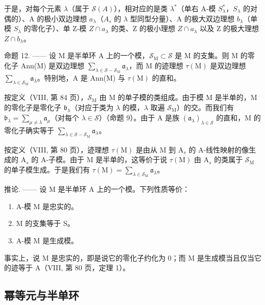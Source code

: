 于是，对每个元素 \(\lambda\)（属于 \(\mathcal{S}(A)\)），相对应的是类 \(\lambda^{*}\)（单右 A-模 \(S_{\lambda}^{*}\)，\(S_{\lambda}\) 的对偶的）、A 的极小双边理想 \(a_{\lambda}\)（\(A_{s}\) 的 \(\lambda\) 型同型分量）、A 的极大双边理想 \(b_{\lambda}\)（单模 \(S_{\lambda}\) 的零化子）、单 Z-模 \(Z \cap a_{\lambda}\) 的类、Z 的极小理想 \(Z \cap a_{\lambda}\) 以及 Z 的极大理想 \(Z \cap b_{\lambda}\)。

命题 12. —— 设 M 是半单环 A 上的一个模，\(\mathcal{S}_{\mathrm{M}} \subset \mathcal{S}\) 是 M 的支集。则 M 的零化子 Ann(M) 是双边理想 \(\sum_{\lambda \in \mathcal{S} - \mathcal{S}_{\mathrm{M}}} \mathfrak{a}_{\lambda}\)，而 M 的迹理想 \(\tau(\mathrm{M})\) 是双边理想 \(\sum_{\lambda \in \mathcal{S}_{\mathrm{M}}} \mathfrak{a}_{\lambda}\)。特别地，A 是 Ann(M) 与 \(\tau(\mathrm{M})\) 的直和。

按定义（VIII, 第 84 页），\(\mathcal{S}_{\mathrm{M}}\) 由 M 的单子模的类组成。由于模 M 是半单的，M 的零化子是零化子 \(\mathfrak{b}_{\lambda}\)（对应于类为 \(\lambda\) 的模，\(\lambda\) 取遍 \(\mathcal{S}_{\mathrm{M}}\)）的交。而我们有 \(\mathfrak{b}_{\lambda} = \sum_{\mu \neq \lambda} \mathfrak{a}_{\mu}\)（对每个 \(\lambda \in \mathcal{S}\)）（命题 9）。由于 A 是族 \((\mathfrak{a}_{\lambda})_{\lambda \in \mathcal{S}}\) 的直和，M 的零化子确实等于 \(\sum_{\lambda \in \mathcal{S} - \mathcal{S}_{\mathrm{M}}} \mathfrak{a}_{\lambda}\)。

按定义（VIII, 第 80 页），迹理想 \(\tau(\mathrm{M})\) 是由从 M 到 \(\mathrm{A}_s\) 的 A-线性映射的像生成的 \(\mathrm{A}_s\) 的 A-子模。由于 M 是半单的，这等价于说 \(\tau(\mathrm{M})\) 由 \(\mathrm{A}_s\) 的类属于 \(\mathcal{S}_{\mathrm{M}}\) 的单子模生成。于是我们有 \(\tau(\mathrm{M}) = \sum_{\lambda \in \mathcal{S}_{\mathrm{M}}} \mathfrak{a}_{\lambda}\)。

推论. —— 设 M 是半单环 A 上的一个模。下列性质等价：

\begin{enumerate}
\def\labelenumi{(\roman{enumi})}
\item
  A-模 M 是忠实的。
\item
  M 的支集等于 S。
\item
  A-模 M 是生成模。
\end{enumerate}

事实上，说 M 是忠实的，即是说它的零化子约化为 0；而 M 是生成模当且仅当它的迹等于 A（VIII, 第 80 页，定理 1）。

\subsection{幂等元与半单环}

